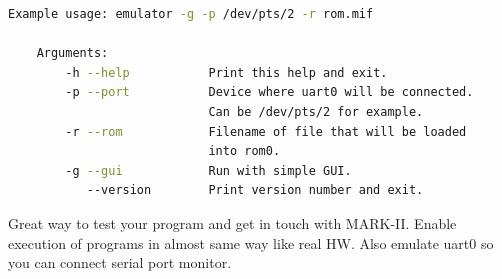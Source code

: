 \begin{lstlisting}[language=bash, frame=single]
    Example usage: emulator -g -p /dev/pts/2 -r rom.mif

    Arguments:
        -h --help           Print this help and exit.
        -p --port           Device where uart0 will be connected.
                            Can be /dev/pts/2 for example.
        -r --rom            Filename of file that will be loaded
                            into rom0.
        -g --gui            Run with simple GUI.
           --version        Print version number and exit.
\end{lstlisting}

Great way to test your program and get in touch with MARK-II. Enable execution
of programs in almost same way like real HW. Also emulate uart0 so you can
connect serial port monitor.


